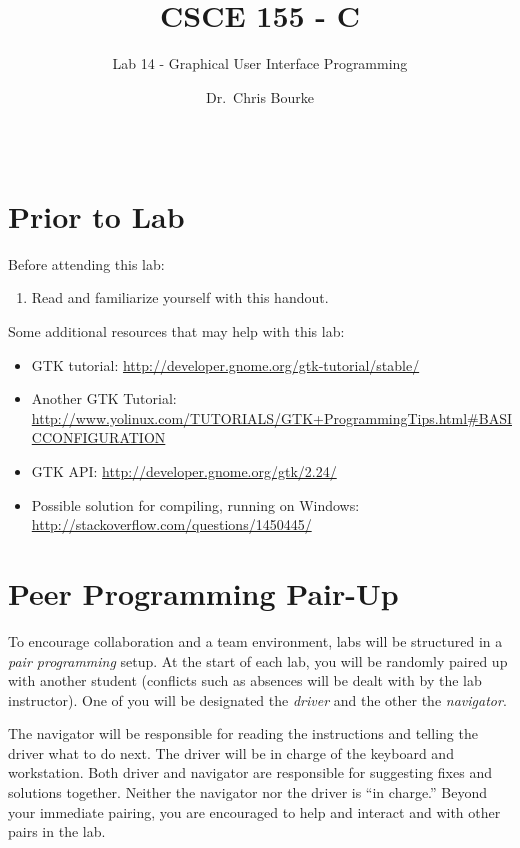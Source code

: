 \documentclass[12pt]{scrartcl}
\title{CSCE 155 - C}
\subtitle{Lab 14 - Graphical User Interface Programming}
\author{Dr.\ Chris Bourke}
\date{~}
\begin{document}
\maketitle

\section*{Prior to Lab}

Before attending this lab:
\begin{enumerate}
  \item Read and familiarize yourself with this handout.
\end{enumerate}

Some additional resources that may help with this lab:
\begin{itemize}
  \item GTK tutorial: \url{http://developer.gnome.org/gtk-tutorial/stable/}
  \item Another GTK Tutorial: \\
  \url{http://www.yolinux.com/TUTORIALS/GTK+ProgrammingTips.html#BASICCONFIGURATION}
  \item GTK API: \url{http://developer.gnome.org/gtk/2.24/}
  \item Possible solution for compiling, running on Windows: \\
  \url{http://stackoverflow.com/questions/1450445/}
\end{itemize}

\section*{Peer Programming Pair-Up}

To encourage collaboration and a team environment, labs will be
structured in a \emph{pair programming} setup.  At the start of
each lab, you will be randomly paired up with another student 
(conflicts such as absences will be dealt with by the lab instructor).
One of you will be designated the \emph{driver} and the other
the \emph{navigator}.  

The navigator will be responsible for reading the instructions and
telling the driver what to do next.  The driver will be in charge of the
keyboard and workstation.  Both driver and navigator are responsible
for suggesting fixes and solutions together.  Neither the navigator
nor the driver is ``in charge.''  Beyond your immediate pairing, you
are encouraged to help and interact and with other pairs in the lab.
\end{document}
